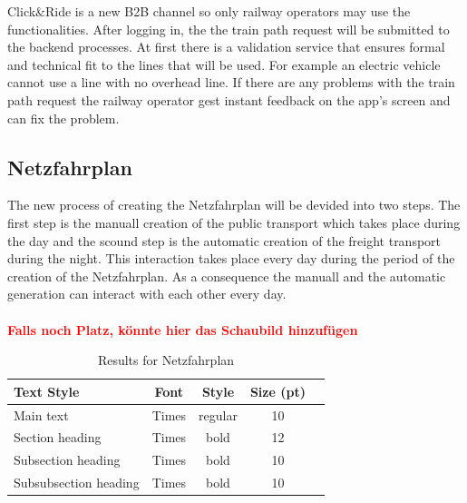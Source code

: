 Click\&Ride is a new B2B channel so only railway operators may use the functionalities. After logging in, the the train path request will be submitted to the backend processes. At first there is a validation service that ensures formal and technical fit to the lines that will be used. For example an electric vehicle cannot use a line with no overhead line. If there are any problems with the train path request the railway operator gest instant feedback on the app's screen and can fix the problem.

\subsection{Netzfahrplan}
\label{chap:Netzfahrplan}
The new process of creating the Netzfahrplan will be devided into two steps. The first step is the manuall creation of the 
public transport which takes place during the day and the scound step is the automatic creation of the freight transport during the night. This interaction takes place every day during the period of the creation of the Netzfahrplan. As a consequence the manuall and the automatic generation can interact with each other every day. \\
\\
\textbf{\textcolor{red}{Falls noch Platz, könnte hier das Schaubild hinzufügen}}
%
\begin{table}[h]
	\centering
	\caption{Results for Netzfahrplan}
	\label{tab:result_Netzfpl}
	\begin{tabular}{lcccc} \hline
		\textbf{Text Style}   & \textbf{Font} & \textbf{Style} & \textbf{Size (pt)} \\ \hline
		Main text             & Times         & regular        & 10                 \\
		Section heading       & Times         & bold           & 12                 \\
		Subsection heading    & Times         & bold           & 10                 \\
		Subsubsection heading & Times         & bold           & 10                 \\ \hline
	\end{tabular}
\end{table}
\par


